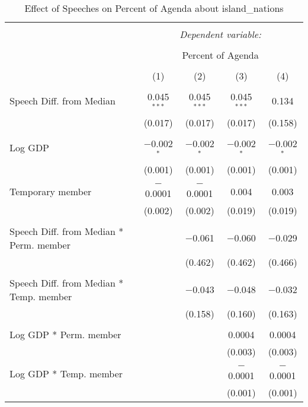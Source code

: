 
\begin{table}[!htbp] \centering 
  \caption{Effect of Speeches on Percent of Agenda about  island_nations} 
  \label{} 
\begin{tabular}{@{\extracolsep{5pt}}lcccc} 
\\[-1.8ex]\hline 
\hline \\[-1.8ex] 
 & \multicolumn{4}{c}{\textit{Dependent variable:}} \\ 
\cline{2-5} 
\\[-1.8ex] & \multicolumn{4}{c}{Percent of Agenda} \\ 
\\[-1.8ex] & (1) & (2) & (3) & (4)\\ 
\hline \\[-1.8ex] 
 Speech Diff. from Median & 0.045$^{***}$ & 0.045$^{***}$ & 0.045$^{***}$ & 0.134 \\ 
  & (0.017) & (0.017) & (0.017) & (0.158) \\ 
  & & & & \\ 
 Log GDP & $-$0.002$^{*}$ & $-$0.002$^{*}$ & $-$0.002$^{*}$ & $-$0.002$^{*}$ \\ 
  & (0.001) & (0.001) & (0.001) & (0.001) \\ 
  & & & & \\ 
 Temporary member & $-$0.0001 & $-$0.0001 & 0.004 & 0.003 \\ 
  & (0.002) & (0.002) & (0.019) & (0.019) \\ 
  & & & & \\ 
 Speech Diff. from Median * Perm. member &  & $-$0.061 & $-$0.060 & $-$0.029 \\ 
  &  & (0.462) & (0.462) & (0.466) \\ 
  & & & & \\ 
 Speech Diff. from Median * Temp. member &  & $-$0.043 & $-$0.048 & $-$0.032 \\ 
  &  & (0.158) & (0.160) & (0.163) \\ 
  & & & & \\ 
 Log GDP * Perm. member &  &  & 0.0004 & 0.0004 \\ 
  &  &  & (0.003) & (0.003) \\ 
  & & & & \\ 
 Log GDP * Temp. member &  &  & $-$0.0001 & $-$0.0001 \\ 
  &  &  & (0.001) & (0.001) \\ 

\end{tabular}
\end{table}
